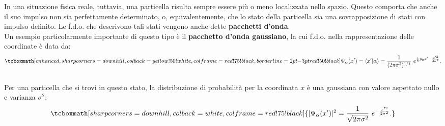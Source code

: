 In una situazione fisica reale, tuttavia, una particella risulta sempre essere più o meno localizzata nello spazio. Questo comporta che anche il suo impulso non sia perfettamente determinato, o, equivalentemente, che lo stato della particella sia una sovrapposizione di stati con impulso definito. Le f.d.o. che descrivono tali stati vengono anche dette \textbf{pacchetti d'onda}.\\

Un esempio particolarmente importante di questo tipo è il \textbf{pacchetto d'onda gaussiano}, la cui f.d.o. nella rappresentazione delle coordinate è data da:
	\begin{equation}
		\tcboxmath[enhanced,sharp corners=downhill ,colback=yellow!50!white,colframe=red!75!black, borderline={2pt}{-3pt}{red!50!black}]{
			\Psi_\alpha (x') = \langle x' | \alpha \rangle = \frac{1}{(2 \pi \sigma^2)^{1/4}}~  e^{\frac{i}{\hbar}p_0 x' - \frac{x'^2}{4 \sigma^2}}.
			}
	\end{equation}\\
	
Per una particella che si trovi in questo stato, la distribuzione di probabilità per la coordinata $x$ è una gaussiana con valore aspettato nullo e varianza $\sigma^2$:
	\begin{equation}
		\tcboxmath[sharp corners=downhill ,colback=white,colframe=red!75!black]{
			|\Psi_\alpha (x')|^2 = \frac{1}{\sqrt{2 \pi \sigma^2}}~   e^{- \frac{x'^2}{2 \sigma^2}}.
			}
	\end{equation}\\
	
